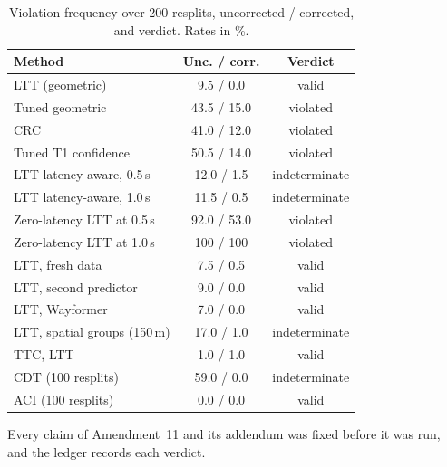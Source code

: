 \documentclass[lettersize,journal]{IEEEtran}
\begin{document}
\begin{table}[h]
\caption{Violation frequency over 200 resplits, uncorrected / corrected,
and verdict. Rates in \%.}
\label{tab:valid}
\centering
\scriptsize\setlength{\tabcolsep}{2.5pt}
\begin{tabular}{lcc}
\toprule
Method & Unc. / corr. & Verdict \\
\midrule
LTT (geometric) & 9.5 / 0.0 & valid \\
Tuned geometric & 43.5 / 15.0 & violated \\
CRC & 41.0 / 12.0 & violated \\
Tuned T1 confidence & 50.5 / 14.0 & violated \\
LTT latency-aware, 0.5\,s & 12.0 / 1.5 & indeterminate \\
LTT latency-aware, 1.0\,s & 11.5 / 0.5 & indeterminate \\
Zero-latency LTT at 0.5\,s & 92.0 / 53.0 & violated \\
Zero-latency LTT at 1.0\,s & 100 / 100 & violated \\
LTT, fresh data & 7.5 / 0.5 & valid \\
LTT, second predictor & 9.0 / 0.0 & valid \\
LTT, Wayformer & 7.0 / 0.0 & valid \\
LTT, spatial groups (150\,m) & 17.0 / 1.0 & indeterminate \\
TTC, LTT & 1.0 / 1.0 & valid \\
CDT (100 resplits) & 59.0 / 0.0 & indeterminate \\
ACI (100 resplits) & 0.0 / 0.0 & valid \\
\bottomrule
\end{tabular}
\end{table}

Every claim of Amendment~11 and its addendum was fixed before it was run, and the ledger records each verdict.
\end{document}
